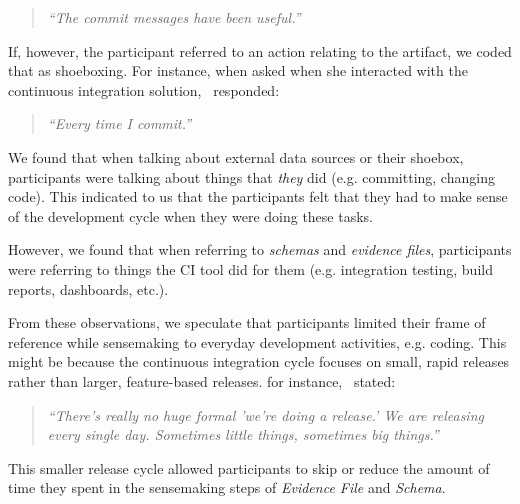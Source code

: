 \documentclass{sig-alternate}
\begin{document}
\begin{quote}
\textit{``The commit messages have been  useful.''}
\end{quote}


If, however, the participant referred to an action relating to the artifact, we coded that as shoeboxing. For instance, when asked when she interacted with the continuous integration solution, \srutitwo\ responded: 

\begin{quote}
\textit{``Every time I commit.''}	
\end{quote}

We found that when talking about external data sources  or their shoebox, participants were talking about things that \textit{they} did (e.g. committing, changing code). This indicated to us that the participants felt that they had to make sense of the development cycle when they were doing these tasks. 

However, we found that when referring to \textit{schemas} and \textit{evidence files}, participants were referring to things the CI tool did for them (e.g. integration testing, build reports, dashboards, etc.). 

From these observations, we speculate that participants limited their frame of reference while sensemaking to everyday development activities, e.g. coding. This might be because the continuous integration cycle focuses on small, rapid releases rather than larger, feature-based releases. for instance, \cpg\ stated:

\begin{quote}
\textit{``There's really no huge formal 'we're doing a release.' We are releasing every single day. Sometimes little things, sometimes big things.''}
\end{quote}


This smaller release cycle allowed participants to skip or reduce the amount of time they spent in the sensemaking steps of \textit{Evidence File} and \textit{Schema}. 
\end{document}
